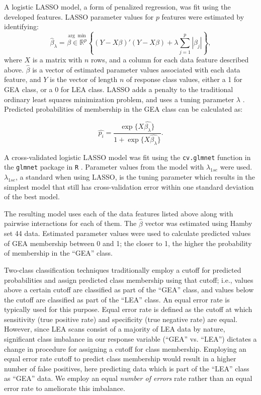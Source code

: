 \documentclass[12pt]{article}
\begin{document}
A logistic LASSO model, a form of penalized regression, was fit using
the developed features. LASSO parameter values for \(p\) features were
estimated by identifying:\\
\[
\hat{\beta}_{\lambda} = \stackrel{\arg\min}{\beta \in \mathbb{R}^p} \left\{  (Y - X\beta)'(Y - X\beta) + \lambda \sum_{j=1}^{p}|\beta_j|\right\},
\] where \(X\) is a matrix with \(n\) rows, and a column for each data
feature described above. \(\hat{\beta}\) is a vector of estimated
parameter values associated with each data feature, and \(Y\) is the
vector of length \(n\) of response class values, either a 1 for GEA
class, or a 0 for LEA class.
{\color{purple}{This is quite the leap from the ending of the previous sentence:}}
LASSO adds a penalty to the traditional ordinary least squares
minimization problem, and uses a tuning parameter \(\lambda\)
\citep{LASSO}. Predicted probabilities of membership in the GEA class
can be calculated as:
{\color{purple}{I would first describe how to use the features as you do further down.}}

\[ \widehat{p_i} = \frac{\exp\{ X\hat{\beta_{\lambda}}\}}{1 + \exp \{X\hat{\beta_{\lambda}}\}}.\]

A cross-validated logistic LASSO model was fit using the
\texttt{cv.glmnet} function in the \texttt{glmnet} package in \texttt{R}
\cite{glmnet}. Parameter values from the model with \(\lambda_{1se}\)
were used. \(\lambda_{1se}\), a standard when using LASSO, is the tuning
parameter which results in the simplest model that still has
cross-validation error within one standard deviation of the best model.

The resulting model uses each of the data features listed above along
with pairwise interactions for each of them. The \(\hat{\beta}\) vector
was estimated using Hamby set 44 data. Estimated parameter values were
used to calculate predicted values of GEA membership between 0 and 1;
the closer to 1, the higher the probability of membership in the ``GEA''
class.

Two-class classification techniques traditionally employ a cutoff for
predicted probabilities and assign predicted class membership using that
cutoff; i.e., values above a certain cutoff are classified as part of
the ``GEA'' class, and values below the cutoff are classified as part of
the ``LEA'' class. An equal error rate is typically used for this
purpose. Equal error rate is defined as the cutoff at which sensitivity
(true positive rate) and specificity (true negative rate) are equal.
However, since LEA scans consist of a majority of LEA data by nature,
significant class imbalance in our response variable (``GEA'' vs.
``LEA'') dictates a change in procedure for assigning a cutoff for class
membership. Employing an equal error rate cutoff to predict class
membership would result in a higher number of false positives, here
predicting data which is part of the ``LEA'' class as ``GEA'' data. We
employ an equal \textit{number of errors} rate rather than an equal
error rate to ameliorate this imbalance.
\end{document}
